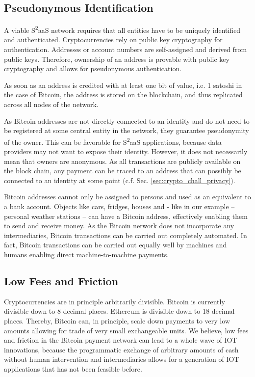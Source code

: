 \subsection{Pseudonymous Identification}

A viable S\textsuperscript{2}aaS network requires that all entities have  to be  uniquely  identified  and  authenticated. Cryptocurrencies rely on public key cryptography for authentication. Addresses or account numbers are self-assigned and derived from public keys. Therefore, ownership of an address is provable with public key cryptography and allows for pseudonymous authentication.

As soon as an address is credited with at least one bit of value, i.e. 1 satoshi in the case of Bitcoin, the address is stored on the blockchain, and thus replicated across all nodes of the network.

As Bitcoin addresses are not directly connected to an identity and do not need to be registered at some central entity in the network, they guarantee pseudonymity of the owner. This can be favorable for S\textsuperscript{2}aaS applications, because data providers may not want to expose their identity. However, it does not necessarily mean that owners are anonymous. As all transactions are publicly available on the block chain, any payment can be traced to an address that can possibly be connected to an identity at some point (c.f. Sec. \ref{sec:crypto_chall_privacy}).

Bitcoin addresses cannot only be assigned to persons and used as an equivalent to a bank account. Objects like cars, fridges, houses and - like in our example -- personal weather stations -- can have a Bitcoin address, effectively enabling them to send and receive money. As the Bitcoin network does not incorporate any intermediaries, Bitcoin transactions can be carried out completely automated. In fact, Bitcoin transactions can be carried out equally well by machines and humans enabling direct machine-to-machine payments.

\subsection{Low Fees and Friction}

Cryptocurrencies are in principle arbitrarily divisible. Bitcoin is currently divisible down to 8 decimal places. Ethereum is divisible down to 18 decimal places. 
Thereby, Bitcoin can, in principle, scale down payments to very low amounts allowing for trade of very small exchangeable units. We believe, low fees and friction in the Bitcoin payment network can lead to a whole wave of \ac{IOT} innovations, because the programmatic exchange of arbitrary amounts of cash without human intervention and intermediaries allows for a generation of \ac{IOT} applications that has not been feasible before.

